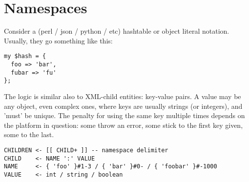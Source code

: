 \section{Namespaces}

Consider a (perl / json / python / etc) hashtable or object literal
notation. Usually, they go something like this:

\begin{myquote}
\begin{verbatim}
my $hash = {
  foo => 'bar',
  fubar => 'fu'
};

\end{verbatim}
\end{myquote}

The logic is similar also to XML-child entities: key-value pairs.
A value may be any object, even complex ones, where keys are
usually strings (or integers), and 'must' be unique. The penalty
for using the same key multiple times depends on the platform in
question: some throw an error, some stick to the first key given,
some to the last.

\begin{myquote}
\begin{verbatim}
CHILDREN <- [[ CHILD+ ]] -- namespace delimiter
CHILD    <- NAME ':' VALUE
NAME     <- { 'foo' }#1-3 / { 'bar' }#0- / { 'foobar' }#-1000
VALUE    <- int / string / boolean

\end{verbatim}
\end{myquote}



